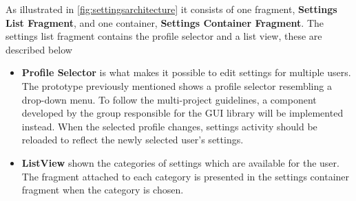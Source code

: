 As illustrated in \cref{fig:settingsarchitecture} it consists of one fragment, \textbf{Settings List Fragment}, and one container, \textbf{Settings Container Fragment}.
The settings list fragment contains the profile selector and a list view, these are described below
\begin{itemize}
\item \textbf{Profile Selector} is what makes it possible to edit settings for multiple users.
The prototype previously mentioned shows a profile selector resembling a drop-down menu.
To follow the multi-project guidelines, a component developed by the group responsible for the GUI library will be implemented instead.
When the selected profile changes, settings activity should be reloaded to reflect the newly selected user's settings.
\item \textbf{ListView} shown the categories of settings which are available for the user.
The fragment attached to each category is presented in the settings container fragment when the category is chosen.
\end{itemize}
























